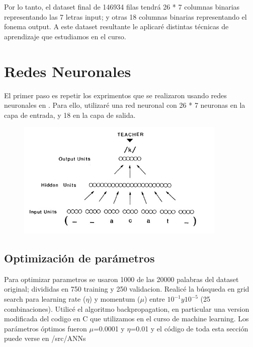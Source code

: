 \documentclass[paper=a4, fontsize=11pt]{scrartcl} %
\numberwithin{equation}{section} %
\numberwithin{figure}{section} %
\numberwithin{table}{section} %
\begin{document}
Por lo tanto, el dataset final de 146934 filas tendrá 26 * 7 columnas binarias representando las 7 letras input; y otras 18 columnas binarias representando el fonema output. A este dataset resultante le aplicaré distintas técnicas de aprendizaje que estudiamos en el curso.

\section{Redes Neuronales}
El primer paso es repetir los exprimentos que se realizaron usando redes neuronales en \cite{parallel}. Para ello, utilizaré una red neuronal con 26 * 7 neuronas en la capa de entrada, y 18 en la capa de salida. 

\begin{figure}[h!]
\centering
\includegraphics[width=100mm]{figure1.jpg}
\end{figure}


\subsection{Optimización de parámetros}

Para optimizar parametros se usaron 1000 de las 20000 palabras del dataset original; divididas en 750 training y 250 validacion. Realicé la búsqueda en grid search para learning rate ($\eta$) y momentum ($\mu$) entre  $10^{-1} y 10^{-5}$ (25 combinaciones). Utilicé el algoritmo backpropagation, en particular una version modificada del codigo en C que utilizamos en el curso de machine learning. Los parámetros óptimos fueron $\mu$=0.0001 y $\eta$=0.01 y el código de toda esta sección puede verse en /src/ANNs

\end{document}
